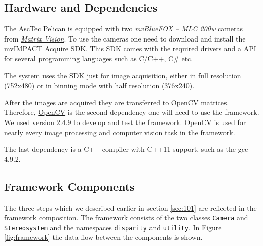 \documentclass[11pt]{article}
\begin{document}
\subsection{Hardware and Dependencies}  
The AscTec Pelican is equipped with two  \emph{\href{http://www.matrix-vision.com/USB2.0-single-board-camera-mvbluefox-mlc.html?camera=mvBlueFOX-MLC200wC&selectInterface=Alle&selectMpixels=Alle&selectFps=Alle&selectSensor=Alle&selectColor=Alle&selectSize=Alle&selectShutter=Alle&selectModel=Alle&col=1&row=0}{mvBlueFOX -- MLC 200w}} cameras from \emph{\href{http://www.matrix-vision.com/home-en.html}{Matrix Vision}}. To use the cameras one need to download and install the \href{http://www.matrix-vision.com/programming-interface-mvimpact-acquire.html}{mvIMPACT Acquire SDK}. This SDK comes with the required drivers and a API for several programming languages such as C/C++, C\# etc. 

The system uses the SDK just for image acquisition, either in full resolution (752x480) or in binning mode with half resolution (376x240).

After the images are acquired they are transferred to OpenCV matrices. Therefore, \href{http://opencv.org/}{OpenCV} is the second dependency one will need to use the framework. We used version 2.4.9 to develop and test the framework. OpenCV is used for nearly every image processing and computer vision task in the framework.

The last dependency is a C++ compiler with C++11 support, such as the gcc-4.9.2.

\subsection{Framework Components}
The three steps which we described earlier in section \ref{sec:101} are reflected in the framework composition. The framework consists of the two classes \texttt{Camera} and \texttt{Stereosystem} and the namespaces \texttt{disparity} and \texttt{utility}. In Figure \ref{fig:framework} the data flow between the components is shown.
\end{document}
